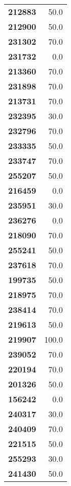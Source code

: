 \documentclass[11pt]{article}
\begin{document}
\begin{center}
\begin{longtable}{lr}
\bottomrule
\endlastfoot
\textbf{212883} &                  50.0 \\
\textbf{212900} &                  50.0 \\
\textbf{231302} &                  70.0 \\
\textbf{231732} &                   0.0 \\
\textbf{213360} &                  70.0 \\
\textbf{231898} &                  70.0 \\
\textbf{213731} &                  70.0 \\
\textbf{232395} &                  30.0 \\
\textbf{232796} &                  70.0 \\
\textbf{233335} &                  50.0 \\
\textbf{233747} &                  70.0 \\
\textbf{255207} &                  50.0 \\
\textbf{216459} &                   0.0 \\
\textbf{235951} &                  30.0 \\
\textbf{236276} &                   0.0 \\
\textbf{218090} &                  70.0 \\
\textbf{255241} &                  50.0 \\
\textbf{237618} &                  70.0 \\
\textbf{199735} &                  50.0 \\
\textbf{218975} &                  70.0 \\
\textbf{238414} &                  70.0 \\
\textbf{219613} &                  50.0 \\
\textbf{219907} &                 100.0 \\
\textbf{239052} &                  70.0 \\
\textbf{220194} &                  70.0 \\
\textbf{201326} &                  50.0 \\
\textbf{156242} &                   0.0 \\
\textbf{240317} &                  30.0 \\
\textbf{240409} &                  70.0 \\
\textbf{221515} &                  50.0 \\
\textbf{255293} &                  30.0 \\
\textbf{241430} &                  50.0 \\

\end{longtable}
\end{center}
\end{document}

